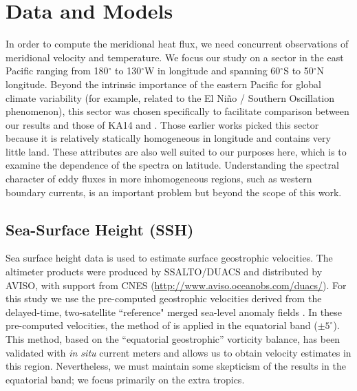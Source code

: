 \documentclass[10pt]{article}
\begin{document}
\section{Data and Models}

In order to compute the meridional heat flux, we need concurrent observations of meridional velocity and temperature.
We focus our study on a sector in the east Pacific ranging from 180$^\circ$ to 130$^\circ$W in longitude and spanning 60$^\circ$S to 50$^\circ$N longitude. Beyond the intrinsic importance of the eastern Pacific for global climate variability (for example, related to the El Ni\~no / Southern Oscillation phenomenon), this sector was chosen specifically to facilitate comparison between our results and those of KA14 and \citet{AbernatheyMarshall2013}. Those earlier works picked this sector because it is relatively statically homogeneous in longitude and contains very little land. These attributes are also well suited to our purposes here, which is to examine the dependence of the spectra on latitude. Understanding the spectral character of eddy fluxes in more inhomogeneous regions, such as western boundary currents, is an important problem but beyond the scope of this work.

\subsection{Sea-Surface Height (SSH)}
Sea surface height data is used to estimate surface geostrophic velocities. The altimeter products were produced by SSALTO/DUACS and distributed by AVISO, with support from CNES (\url{http://www.aviso.oceanobs.com/duacs/}). For this study we use the pre-computed geostrophic velocities derived from the delayed-time, two-satellite ``reference" merged sea-level anomaly fields . In these pre-computed velocities, the method of \citet{LagerloefEtAl1999} is applied in the equatorial band ($\pm 5^\circ$). This method, based on the ``equatorial geostrophic'' vorticity balance, has been validated with {\em in situ} current meters and allows us to obtain velocity estimates in this region. Nevertheless, we must maintain some skepticism of the results in the equatorial band;  we focus primarily on the extra tropics.
\end{document}
